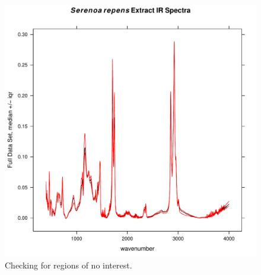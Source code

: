 \documentclass[letter,10pt,twocolumn,twoside,printwatermark=false]{pinp}
\begin{document}
\begin{figure}

{\centering \includegraphics[width=\linewidth,height=\linewidth]{ChemoSpec2_files/figure-latex/Chunk14-1} 

}

\caption{\label{surv}Checking for regions of no interest.}\label{fig:Chunk14}
\end{figure}

\begin{Shaded}
\begin{Highlighting}[]
   \NormalTok{,}
\end{Highlighting}
\end{Shaded}
\end{document}
